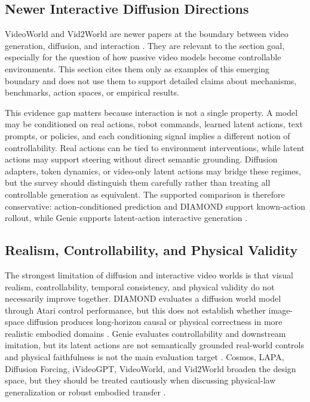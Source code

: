 \subsection{Newer Interactive Diffusion Directions}

VideoWorld and Vid2World are newer papers at the boundary between video generation, diffusion, and interaction \cite{ren2025_videoworld_prov,huang2026_vid2world_prov}. They are relevant to the section goal, especially for the question of how passive video models become controllable environments. This section cites them only as examples of this emerging boundary and does not use them to support detailed claims about mechanisms, benchmarks, action spaces, or empirical results.

This evidence gap matters because interaction is not a single property. A model may be conditioned on real actions, robot commands, learned latent actions, text prompts, or policies, and each conditioning signal implies a different notion of controllability. Real actions can be tied to environment interventions, while latent actions may support steering without direct semantic grounding. Diffusion adapters, token dynamics, or video-only latent actions may bridge these regimes, but the survey should distinguish them carefully rather than treating all controllable generation as equivalent. The supported comparison is therefore conservative: action-conditioned prediction and DIAMOND support known-action rollout, while Genie supports latent-action interactive generation \cite{oh2015_action_conditional_video_prediction_prov,finn2016_physical_interaction_video_prediction_prov,alonso2024_diamond_prov,bruce2024_genie_prov}.

\subsection{Realism, Controllability, and Physical Validity}

The strongest limitation of diffusion and interactive video worlds is that visual realism, controllability, temporal consistency, and physical validity do not necessarily improve together. DIAMOND evaluates a diffusion world model through Atari control performance, but this does not establish whether image-space diffusion produces long-horizon causal or physical correctness in more realistic embodied domains \cite{alonso2024_diamond_prov}. Genie evaluates controllability and downstream imitation, but its latent actions are not semantically grounded real-world controls and physical faithfulness is not the main evaluation target \cite{bruce2024_genie_prov}. Cosmos, LAPA, Diffusion Forcing, iVideoGPT, VideoWorld, and Vid2World broaden the design space, but they should be treated cautiously when discussing physical-law generalization or robust embodied transfer \cite{nvidia2025cosmos,ye2025lapa_prov,chen2024diffusion_forcing_prov,wu2024ivideogpt,ren2025_videoworld_prov,huang2026_vid2world_prov}.

